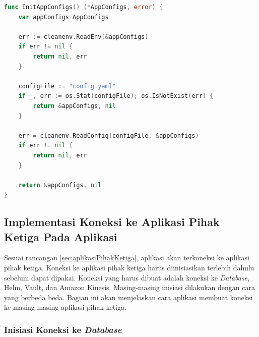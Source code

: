 \begin{lstlisting}[frame=single,language=Go,caption={Fungsi untuk membaca berkas konfigurasi},label={code:configInit}]
func InitAppConfigs() (*AppConfigs, error) {
	var appConfigs AppConfigs

	err := cleanenv.ReadEnv(&appConfigs)
	if err != nil {
		return nil, err
	}

	configFile := "config.yaml"
	if _, err := os.Stat(configFile); os.IsNotExist(err) {
		return &appConfigs, nil
	}

	err = cleanenv.ReadConfig(configFile, &appConfigs)
	if err != nil {
		return nil, err
	}

	return &appConfigs, nil
}
\end{lstlisting}

\subsection{Implementasi Koneksi ke Aplikasi Pihak Ketiga Pada Aplikasi}

Sesuai rancangan \ref{sec:aplikasiPihakKetiga}, aplikasi akan terkoneksi ke aplikasi pihak ketiga. Koneksi ke aplikasi pihak ketiga harus diinisiasikan terlebih dahulu sebelum dapat dipakai. Koneksi yang harus dibuat adalah koneksi ke \textit{Database}, Helm, Vault, dan Amazon Kinesis. Masing-masing inisiasi dilakukan dengan cara yang berbeda beda. Bagian ini akan menjelaskan cara aplikasi membuat koneksi ke masing masing aplikasi pihak ketiga.

\subsubsection{Inisiasi Koneksi ke \textit{Database}}
\label{sec:initDB}

